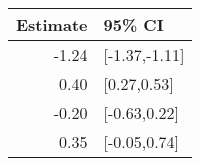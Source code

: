 \begin{tabular}{rl}
  \hline
Estimate & 95\% CI \\ 
  \hline
-1.24 & [-1.37,-1.11] \\ 
  0.40 & [0.27,0.53] \\ 
  -0.20 & [-0.63,0.22] \\ 
  0.35 & [-0.05,0.74] \\ 
   \hline
\end{tabular}


